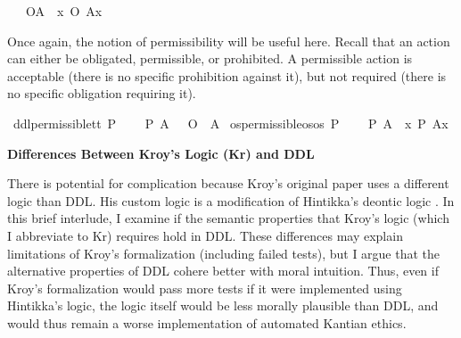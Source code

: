 \begin{isabellebody}
\ \ \ {\isachardoublequoteopen}\isactrlemph O{\isacharbraceleft}A{\isacharbraceright}\ {\isasymequiv}\ {\isasymlambda}x{\isachardot}\ {\isacharparenleft}O\ {\isacharbraceleft}A{\isacharparenleft}x{\isacharparenright}{\isacharbraceright}{\isacharparenright}{\isachardoublequoteclose}%
\begin{isamarkuptext}%
Once again, the notion of permissibility will be useful here. Recall that an action can either be 
obligated, permissible, or prohibited. A permissible action is acceptable (there is no specific prohibition 
against it), but not required (there is no specific obligation requiring it).%
\end{isamarkuptext}\isamarkuptrue%
\isamarkupfalse%
\ ddl{\isacharunderscore}permissible{\isacharcolon}{\isacharcolon}{\isachardoublequoteopen}t{\isasymRightarrow}t{\isachardoublequoteclose}\ {\isacharparenleft}{\isachardoublequoteopen}P\ {\isacharbraceleft}{\isacharunderscore}{\isacharbraceright}{\isachardoublequoteclose}{\isacharparenright}\isanewline
\ \ \ {\isachardoublequoteopen}P\ {\isacharbraceleft}A{\isacharbraceright}\ {\isasymequiv}\ \isactrlbold {\isasymnot}\ {\isacharparenleft}O\ {\isacharbraceleft}\isactrlbold {\isasymnot}\ A{\isacharbraceright}{\isacharparenright}{\isachardoublequoteclose}\isanewline
{}\isamarkupfalse%
\ os{\isacharunderscore}permissible{\isacharcolon}{\isacharcolon}{\isachardoublequoteopen}os{\isasymRightarrow}os{\isachardoublequoteclose}\ {\isacharparenleft}{\isachardoublequoteopen}\isactrlemph P\ {\isacharbraceleft}{\isacharunderscore}{\isacharbraceright}{\isachardoublequoteclose}{\isacharparenright}\isanewline
\ \ \ {\isachardoublequoteopen}\isactrlemph P\ {\isacharbraceleft}A{\isacharbraceright}\ {\isasymequiv}\ {\isasymlambda}x{\isachardot}\ P\ {\isacharbraceleft}A{\isacharparenleft}x{\isacharparenright}{\isacharbraceright}{\isachardoublequoteclose}%
\begin{isamarkuptext}%
\noindent \textbf{Differences Between Kroy's Logic (Kr) and DDL}%
\end{isamarkuptext}\isamarkuptrue%
%
\begin{isamarkuptext}%
There is potential for complication because Kroy's original paper uses a different logic than DDL. 
His custom logic is a modification of Hintikka's deontic logic \citep{hintikka}. In this brief interlude, 
I examine if the semantic properties that Kroy's logic (which I abbreviate to Kr) requires 
hold in DDL. These differences may explain limitations of Kroy's formalization (including failed tests), but I argue that 
the alternative properties of DDL cohere better with moral intuition. Thus, even if Kroy's formalization
would pass more tests if it were implemented using Hintikka's logic, the logic itself would be less 
morally plausible than DDL, and would thus remain a worse implementation of automated Kantian ethics.  


\end{isamarkuptext}
\end{isabellebody}
